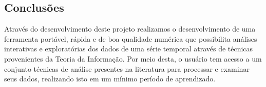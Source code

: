 \documentclass[a0,portrait]{sciposter}
\begin{document}
\begin{multicols}{2}

\section*{Conclusões}

\quad Através do desenvolvimento deste projeto realizamos o desenvolvimento de uma ferramenta portável, rápida e de boa qualidade numérica que possibilita análises interativas e exploratórias dos dados de uma série temporal através de técnicas provenientes da Teoria da Informação.
Por meio desta, o usuário tem acesso a um conjunto técnicas de análise presentes na literatura para processar e examinar seus dados, realizando isto em um mínimo período de aprendizado.


\nocite{*}
 
 



\end{multicols}
\end{document}

